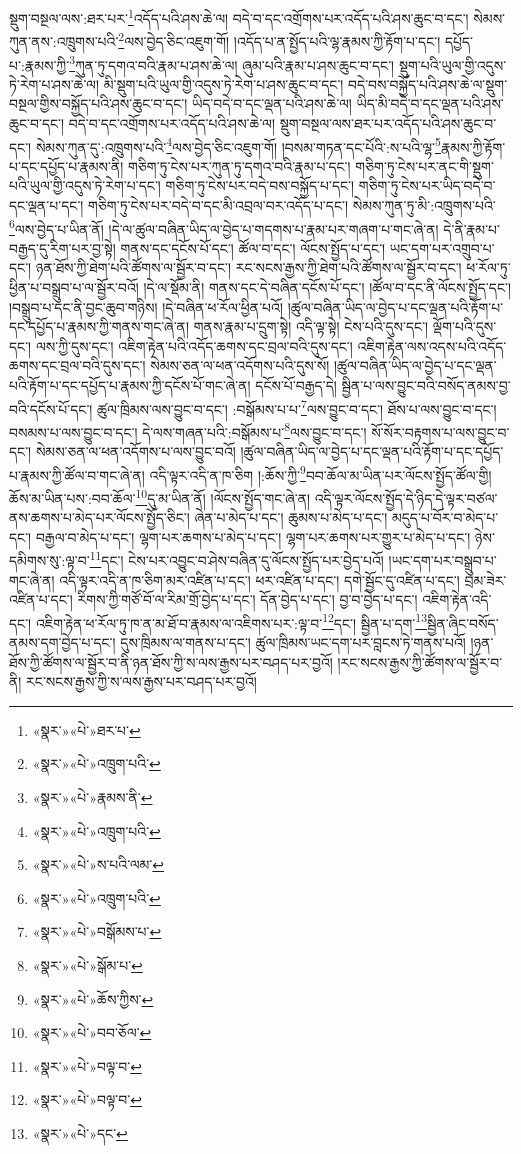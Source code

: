 སྡུག་བསྔལ་ལས་:ཐར་པར་\footnote{«སྣར་»«པེ་»ཐར་པ་}འདོད་པའི་ཤས་ཆེ་ལ། བདེ་བ་དང་འགྲོགས་པར་འདོད་པའི་ཤས་ཆུང་བ་དང་། སེམས་ཀུན་ནས་:འཁྲུགས་པའི་\footnote{«སྣར་»«པེ་»འཁྲུག་པའི་}ལས་བྱེད་ཅིང་འཇུག་གོ། །འདོད་པ་ན་སྤྱོད་པའི་ལྷ་རྣམས་ཀྱི་རྟོག་པ་དང་། དཔྱོད་པ་:རྣམས་ཀྱི་\footnote{«སྣར་»«པེ་»རྣམས་ནི་}ཀུན་ཏུ་དགའ་བའི་རྣམ་པ་ཤས་ཆེ་ལ། ཞུམ་པའི་རྣམ་པ་ཤས་ཆུང་བ་དང་། སྡུག་པའི་ཡུལ་གྱི་འདུས་ཏེ་རེག་པ་ཤས་ཆེ་ལ། མི་སྡུག་པའི་ཡུལ་གྱི་འདུས་ཏེ་རེག་པ་ཤས་ཆུང་བ་དང་། བདེ་བས་བསྐྱོད་པའི་ཤས་ཆེ་ལ་སྡུག་བསྔལ་གྱིས་བསྐྱོད་པའི་ཤས་ཆུང་བ་དང་། ཡིད་བདེ་བ་དང་ལྡན་པའི་ཤས་ཆེ་ལ། ཡིད་མི་བདེ་བ་དང་ལྡན་པའི་ཤས་ཆུང་བ་དང་། བདེ་བ་དང་འགྲོགས་པར་འདོད་པའི་ཤས་ཆེ་ལ། སྡུག་བསྔལ་ལས་ཐར་པར་འདོད་པའི་ཤས་ཆུང་བ་དང་། སེམས་ཀུན་དུ་:འཁྲུགས་པའི་\footnote{«སྣར་»«པེ་»འཁྲུག་པའི་}ལས་བྱེད་ཅིང་འཇུག་གོ། །བསམ་གཏན་དང་པོའི་:ས་པའི་ལྷ་\footnote{«སྣར་»«པེ་»ས་པའི་ལམ་}རྣམས་ཀྱི་རྟོག་པ་དང་དཔྱོད་པ་རྣམས་ནི། གཅིག་ཏུ་ངེས་པར་ཀུན་ཏུ་དགའ་བའི་རྣམ་པ་དང་། གཅིག་ཏུ་ངེས་པར་ནང་གི་སྡུག་པའི་ཡུལ་གྱི་འདུས་ཏེ་རེག་པ་དང་། གཅིག་ཏུ་ངེས་པར་བདེ་བས་བསྐྱོད་པ་དང་། གཅིག་ཏུ་ངེས་པར་ཡིད་བདེ་བ་དང་ལྡན་པ་དང་། གཅིག་ཏུ་ངེས་པར་བདེ་བ་དང་མི་འབྲལ་བར་འདོད་པ་དང་། སེམས་ཀུན་ཏུ་མི་:འཁྲུགས་པའི་\footnote{«སྣར་»«པེ་»འཁྲུག་པའི་}ལས་བྱེད་པ་ཡིན་ནོ། །དེ་ལ་ཚུལ་བཞིན་ཡིད་ལ་བྱེད་པ་གདགས་པ་རྣམ་པར་གཞག་པ་གང་ཞེ་ན། དེ་ནི་རྣམ་པ་བརྒྱད་དུ་རིག་པར་བྱ་སྟེ། གནས་དང་དངོས་པོ་དང་། ཚོལ་བ་དང་། ལོངས་སྤྱོད་པ་དང་། ཡང་དག་པར་འགྲུབ་པ་དང་། ཉན་ཐོས་ཀྱི་ཐེག་པའི་ཚོགས་ལ་སྦྱོར་བ་དང་། རང་སངས་རྒྱས་ཀྱི་ཐེག་པའི་ཚོགས་ལ་སྦྱོར་བ་དང་། ཕ་རོལ་ཏུ་ཕྱིན་པ་བསྒྲུབ་པ་ལ་སྦྱོར་བའོ། །དེ་ལ་སྡོམ་ནི། གནས་དང་དེ་བཞིན་དངོས་པོ་དང་། །ཚོལ་བ་དང་ནི་ལོངས་སྤྱོད་དང་། །བསྒྲུབ་པ་དང་ནི་བྱང་ཆུབ་གཉིས། །དེ་བཞིན་ཕ་རོལ་ཕྱིན་པའོ། །ཚུལ་བཞིན་ཡིད་ལ་བྱེད་པ་དང་ལྡན་པའི་རྟོག་པ་དང་དཔྱོད་པ་རྣམས་ཀྱི་གནས་གང་ཞེ་ན། གནས་རྣམ་པ་དྲུག་སྟེ། འདི་ལྟ་སྟེ། ངེས་པའི་དུས་དང་། ལྡོག་པའི་དུས་དང་། ལས་ཀྱི་དུས་དང་། འཇིག་རྟེན་པའི་འདོད་ཆགས་དང་བྲལ་བའི་དུས་དང་། འཇིག་རྟེན་ལས་འདས་པའི་འདོད་ཆགས་དང་བྲལ་བའི་དུས་དང་། སེམས་ཅན་ལ་ཕན་འདོགས་པའི་དུས་སོ། །ཚུལ་བཞིན་ཡིད་ལ་བྱེད་པ་དང་ལྡན་པའི་རྟོག་པ་དང་དཔྱོད་པ་རྣམས་ཀྱི་དངོས་པོ་གང་ཞེ་ན། དངོས་པོ་བརྒྱད་དེ། སྦྱིན་པ་ལས་བྱུང་བའི་བསོད་ནམས་བྱ་བའི་དངོས་པོ་དང་། ཚུལ་ཁྲིམས་ལས་བྱུང་བ་དང་། :བསྒོམས་པ་པ་\footnote{«སྣར་»«པེ་»བསྒོམས་པ་}ལས་བྱུང་བ་དང་། ཐོས་པ་ལས་བྱུང་བ་དང་། བསམས་པ་ལས་བྱུང་བ་དང་། དེ་ལས་གཞན་པའི་:བསྒོམས་པ་\footnote{«སྣར་»«པེ་»སྒོམ་པ་}ལས་བྱུང་བ་དང་། སོ་སོར་བརྟགས་པ་ལས་བྱུང་བ་དང་། སེམས་ཅན་ལ་ཕན་འདོགས་པ་ལས་བྱུང་བའོ། །ཚུལ་བཞིན་ཡིད་ལ་བྱེད་པ་དང་ལྡན་པའི་རྟོག་པ་དང་དཔྱོད་པ་རྣམས་ཀྱི་ཚོལ་བ་གང་ཞེ་ན། འདི་ལྟར་འདི་ན་ཁ་ཅིག །:ཆོས་ཀྱི་\footnote{«སྣར་»«པེ་»ཆོས་ཀྱིས་}བབ་ཆོལ་མ་ཡིན་པར་ལོངས་སྤྱོད་ཚོལ་གྱི། ཆོས་མ་ཡིན་པས་:བབ་ཆོལ་\footnote{«སྣར་»«པེ་»བབ་ཅོལ་}དུ་མ་ཡིན་ནོ། །ལོངས་སྤྱོད་གང་ཞེ་ན། འདི་ལྟར་ལོངས་སྤྱོད་དེ་ཉིད་དེ་ལྟར་བཙལ་ནས་ཆགས་པ་མེད་པར་ལོངས་སྤྱོད་ཅིང་། ཞེན་པ་མེད་པ་དང་། ཆུམས་པ་མེད་པ་དང་། མདུད་པ་བོར་བ་མེད་པ་དང་། བརྒྱལ་བ་མེད་པ་དང་། ལྷག་པར་ཆགས་པ་མེད་པ་དང་། ལྷག་པར་ཆགས་པར་གྱུར་པ་མེད་པ་དང་། ཉེས་དམིགས་སུ་:ལྟ་བ་\footnote{«སྣར་»«པེ་»བལྟ་བ་}དང་། ངེས་པར་འབྱུང་བ་ཤེས་བཞིན་དུ་ལོངས་སྤྱོད་པར་བྱེད་པའོ། །ཡང་དག་པར་བསྒྲུབ་པ་གང་ཞེ་ན། འདི་ལྟར་འདི་ན་ཁ་ཅིག་མར་འཛིན་པ་དང་། ཕར་འཛིན་པ་དང་། དགེ་སྦྱོང་དུ་འཛིན་པ་དང་། བྲམ་ཟེར་འཛིན་པ་དང་། རིགས་ཀྱི་གཙོ་བོ་ལ་རིམ་གྲོ་བྱེད་པ་དང་། དོན་བྱེད་པ་དང་། བྱ་བ་བྱེད་པ་དང་། འཇིག་རྟེན་འདི་དང་། འཇིག་རྟེན་ཕ་རོལ་ཏུ་ཁ་ན་མ་ཐོ་བ་རྣམས་ལ་འཇིགས་པར་:ལྟ་བ་\footnote{«སྣར་»«པེ་»བལྟ་བ་}དང་། སྦྱིན་པ་དག་\footnote{«སྣར་»«པེ་»དང་}སྦྱིན་ཞིང་བསོད་ནམས་དག་བྱེད་པ་དང་། དུས་ཁྲིམས་ལ་གནས་པ་དང་། ཚུལ་ཁྲིམས་ཡང་དག་པར་བླངས་ཏེ་གནས་པའོ། །ཉན་ཐོས་ཀྱི་ཚོགས་ལ་སྦྱོར་བ་ནི་ཉན་ཐོས་ཀྱི་ས་ལས་རྒྱས་པར་བཤད་པར་བྱའོ། །རང་སངས་རྒྱས་ཀྱི་ཚོགས་ལ་སྦྱོར་བ་ནི། རང་སངས་རྒྱས་ཀྱི་ས་ལས་རྒྱས་པར་བཤད་པར་བྱའོ། 